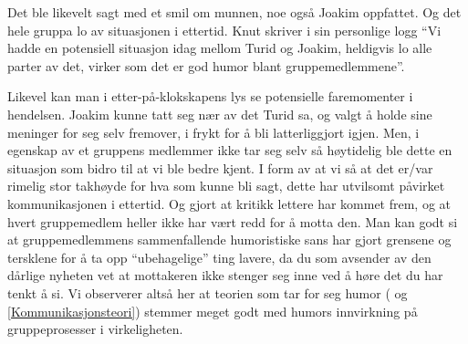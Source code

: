  Det ble likevelt sagt med et smil om munnen, noe også Joakim oppfattet. 
Og det hele gruppa lo av situasjonen i ettertid. Knut skriver i sin personlige
logg ``Vi hadde en potensiell situasjon idag mellom Turid og Joakim, heldigvis
lo alle parter av det, virker som det er god humor blant gruppemedlemmene''.

Likevel kan man i etter-på-klokskapens lys se potensielle faremomenter
i hendelsen. Joakim kunne tatt seg nær av det Turid sa, og valgt å holde sine
meninger for seg selv fremover, i frykt for å bli latterliggjort igjen. Men, i
egenskap av et gruppens medlemmer ikke tar seg selv så høytidelig ble dette en
situasjon som bidro til at vi ble bedre kjent. I form av at vi så at det er/var
rimelig stor takhøyde for hva som kunne bli sagt, dette har utvilsomt påvirket
kommunikasjonen i ettertid. Og gjort at kritikk lettere
har kommet frem, og at hvert gruppemedlem heller ikke har vært redd for å motta
den. Man kan godt si at gruppemedlemmens sammenfallende humoristiske sans har
gjort grensene og tersklene for å ta opp ``ubehagelige'' ting lavere, da du som
avsender av den dårlige nyheten vet at mottakeren ikke stenger seg inne ved å
høre det du har tenkt å si. Vi observerer altså her at teorien som tar for seg
humor (\cite{jj-humor} og \cref{Kommunikasjonsteori}) stemmer meget godt med humors innvirkning på gruppeprosesser i virkeligheten.

